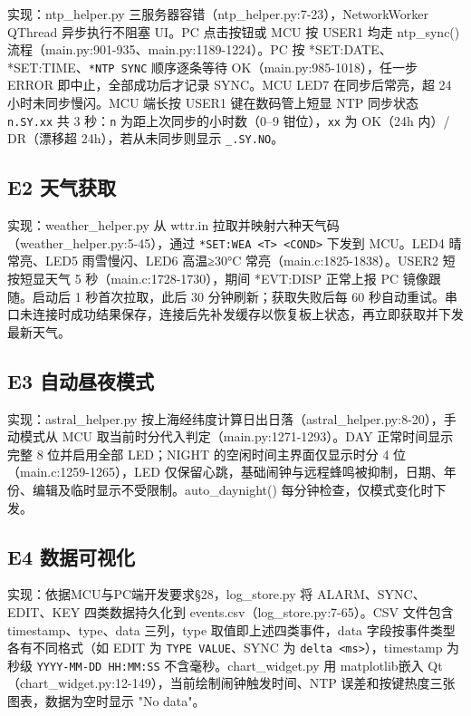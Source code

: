 \documentclass[11pt,a4paper]{article}
\begin{document}
实现：ntp\_helper.py 三服务器容错（ntp\_helper.py:7-23），NetworkWorker QThread 异步执行不阻塞 UI。PC 点击按钮或 MCU 按 USER1 均走 ntp\_sync() 流程（main.py:901-935、main.py:1189-1224）。PC 按 *SET:DATE、*SET:TIME、\texttt{*NTP SYNC} 顺序逐条等待 OK（main.py:985-1018），任一步 ERROR 即中止，全部成功后才记录 SYNC。MCU LED7 在同步后常亮，超 24 小时未同步慢闪。MCU 端长按 USER1 键在数码管上短显 NTP 同步状态 \texttt{n.SY.xx} 共 3 秒：\texttt{n} 为距上次同步的小时数（0–9 钳位），\texttt{xx} 为 OK（24h 内）/ DR（漂移超 24h），若从未同步则显示 \texttt{\_.SY.NO}。

\subsection{E2 天气获取}

实现：weather\_helper.py 从 wttr.in 拉取并映射六种天气码（weather\_helper.py:5-45），通过 \texttt{*SET:WEA <T> <COND>} 下发到 MCU。LED4 晴常亮、LED5 雨雪慢闪、LED6 高温≥30°C 常亮（main.c:1825-1838）。USER2 短按短显天气 5 秒（main.c:1728-1730），期间 *EVT:DISP 正常上报 PC 镜像跟随。启动后 1 秒首次拉取，此后 30 分钟刷新；获取失败后每 60 秒自动重试。串口未连接时成功结果保存，连接后先补发缓存以恢复板上状态，再立即获取并下发最新天气。

\subsection{E3 自动昼夜模式}

实现：astral\_helper.py 按上海经纬度计算日出日落（astral\_helper.py:8-20），手动模式从 MCU 取当前时分代入判定（main.py:1271-1293）。DAY 正常时间显示完整 8 位并启用全部 LED；NIGHT 的空闲时间主界面仅显示时分 4 位（main.c:1259-1265），LED 仅保留心跳，基础闹钟与远程蜂鸣被抑制，日期、年份、编辑及临时显示不受限制。auto\_daynight() 每分钟检查，仅模式变化时下发。

\subsection{E4 数据可视化}

实现：依据MCU与PC端开发要求§28，log\_store.py 将 ALARM、SYNC、EDIT、KEY 四类数据持久化到 events.csv（log\_store.py:7-65）。CSV 文件包含 timestamp、type、data 三列，type 取值即上述四类事件，data 字段按事件类型各有不同格式（如 EDIT 为 \texttt{TYPE VALUE}、SYNC 为 \texttt{delta <ms>}），timestamp 为秒级 \texttt{YYYY-MM-DD HH:MM:SS} 不含毫秒。chart\_widget.py 用 matplotlib嵌入 Qt（chart\_widget.py:12-149），当前绘制闹钟触发时间、NTP 误差和按键热度三张图表，数据为空时显示 "No data"。
\end{document}
